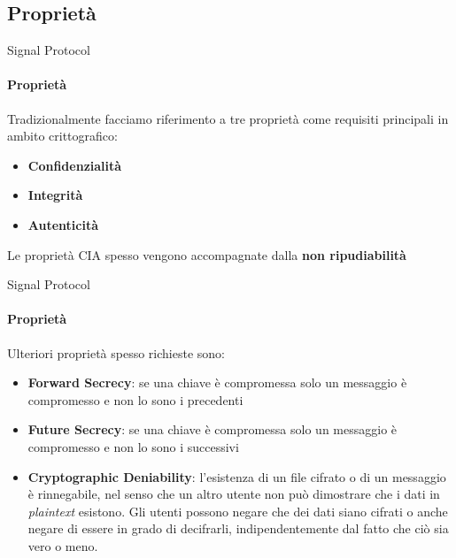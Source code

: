 \subsection{Proprietà}

\begin{frame}{Signal Protocol}
    \framesubtitle{Proprietà}
    Tradizionalmente facciamo riferimento a tre proprietà come requisiti principali in ambito crittografico:
    \begin{itemize}
        \item \textbf{Confidenzialità}
        \item \textbf{Integrità}
        \item \textbf{Autenticità}
    \end{itemize}\pause

    Le proprietà CIA spesso vengono accompagnate dalla \textbf{non ripudiabilità}

\end{frame}

\begin{frame}{Signal Protocol}
    \framesubtitle{Proprietà}
    Ulteriori proprietà spesso richieste sono:
    \begin{itemize}
        \item \textbf{Forward Secrecy}: se una chiave è compromessa solo un messaggio è compromesso e non lo sono i precedenti \pause
        \item \textbf{Future Secrecy}: se una chiave è compromessa solo un messaggio è compromesso e non lo sono i successivi \pause
        \item \textbf{Cryptographic Deniability}: l'esistenza di un file cifrato o di un messaggio è rinnegabile, nel senso che un altro utente non può dimostrare che i dati in \textit{plaintext} esistono. Gli utenti possono negare che dei dati siano cifrati o anche negare di essere in grado di decifrarli, indipendentemente dal fatto che ciò sia vero o meno.
    \end{itemize}

\end{frame}

